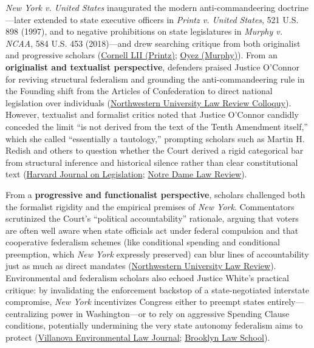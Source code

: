 \documentclass[12pt]{article}
\begin{document}
\textit{New York v. United States} inaugurated the modern anti-commandeering doctrine---later extended to state executive officers in \textit{Printz v. United States}, 521 U.S. 898 (1997), and to negative prohibitions on state legislatures in \textit{Murphy v. NCAA}, 584 U.S. 453 (2018)---and drew searching critique from both originalist and progressive scholars (\href{https://www.law.cornell.edu/supct/html/95-1478.ZO.html}{Cornell LII (Printz)}; \href{https://www.oyez.org/cases/2017/16-476}{Oyez (Murphy)}). From an \textbf{originalist and textualist perspective}, defenders praised Justice O'Connor for reviving structural federalism and grounding the anti-commandeering rule in the Founding shift from the Articles of Confederation to direct national legislation over individuals (\href{https://scholarlycommons.law.northwestern.edu/cgi/viewcontent.cgi?article=1044&context=nulr_online}{Northwestern University Law Review Colloquy}). However, textualist and formalist critics noted that Justice O'Connor candidly conceded the limit ``is not derived from the text of the Tenth Amendment itself,'' which she called ``essentially a tautology,'' prompting scholars such as Martin H. Redish and others to question whether the Court derived a rigid categorical bar from structural inference and historical silence rather than clear constitutional text (\href{https://journals.law.harvard.edu/jol/2025/02/22/anticommandeering-indian-affairs-legislation/}{Harvard Journal on Legislation}; \href{https://scholarship.law.nd.edu/cgi/viewcontent.cgi?article=4931&context=ndlr}{Notre Dame Law Review}).

From a \textbf{progressive and functionalist perspective}, scholars challenged both the formalist rigidity and the empirical premises of \textit{New York}. Commentators scrutinized the Court's ``political accountability'' rationale, arguing that voters are often well aware when state officials act under federal compulsion and that cooperative federalism schemes (like conditional spending and conditional preemption, which \textit{New York} expressly preserved) can blur lines of accountability just as much as direct mandates (\href{https://scholarlycommons.law.northwestern.edu/cgi/viewcontent.cgi?article=1329&context=nulr}{Northwestern University Law Review}). Environmental and federalism scholars also echoed Justice White's practical critique: by invalidating the enforcement backstop of a state-negotiated interstate compromise, \textit{New York} incentivizes Congress either to preempt states entirely---centralizing power in Washington---or to rely on aggressive Spending Clause conditions, potentially undermining the very state autonomy federalism aims to protect (\href{https://digitalcommons.law.villanova.edu/cgi/viewcontent.cgi?article=1254&context=elj}{Villanova Environmental Law Journal}; \href{https://brooklynworks.brooklaw.edu/context/faculty/article/2006/viewcontent/Gold22.pdf}{Brooklyn Law School}).
\end{document}
